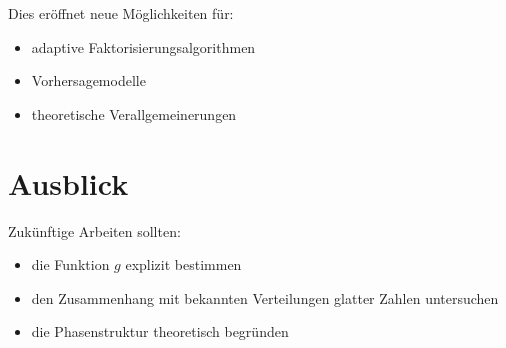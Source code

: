 \documentclass[11pt,a4paper]{article}
\begin{document}
	Dies eröffnet neue Möglichkeiten für:
	
	\begin{itemize}
		\item adaptive Faktorisierungsalgorithmen
		\item Vorhersagemodelle
		\item theoretische Verallgemeinerungen
	\end{itemize}
	
	\section*{Ausblick}
	
	Zukünftige Arbeiten sollten:
	
	\begin{itemize}
		\item die Funktion $g$ explizit bestimmen
		\item den Zusammenhang mit bekannten Verteilungen glatter Zahlen untersuchen
		\item die Phasenstruktur theoretisch begründen
	\end{itemize}
	
\end{document}
